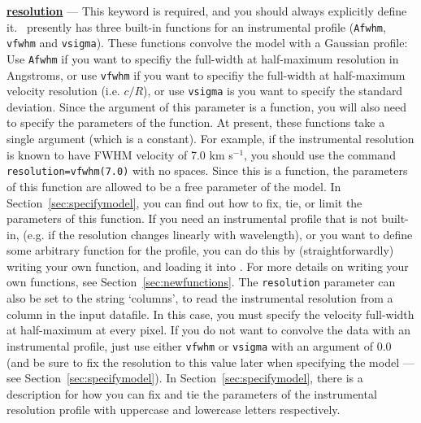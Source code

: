 \textbf{\underline{resolution}} --- This keyword is required, and you should
     always explicitly define it. \alis\ presently has three built-in functions
     for an instrumental profile (\texttt{Afwhm}, \texttt{vfwhm} and \texttt{vsigma}). These functions
     convolve the model with a Gaussian profile: Use \texttt{Afwhm} if you want to
     specifiy the full-width at half-maximum resolution in Angstroms, or use \texttt{vfwhm} if you want to
     specifiy the full-width at half-maximum velocity resolution (i.e. $c/R$), or use
     \texttt{vsigma} is you want to specify the standard deviation. Since the argument
     of this parameter is a function, you will also need to specify the parameters of
     the function. At present, these functions take a single
     argument (which is a constant). For example, if the instrumental resolution is
     known to have FWHM velocity of 7.0 km s$^{-1}$, you should use the command
     \texttt{resolution=vfwhm(7.0)} with no spaces. Since this is a function, the parameters
     of this function are allowed to be a free parameter of the model. In Section~\ref{sec:specifymodel},
     you can find out how to fix, tie, or limit the parameters of this function.
     If you need an instrumental profile that is not built-in, (e.g. if the resolution changes
     linearly with wavelength), or you want to define some arbitrary function for the profile,
     you can do this by (straightforwardly) writing your own function, and loading it into \alis.
     For more details on writing your own functions, see Section~\ref{sec:newfunctions}. The
     \texttt{resolution} parameter can also be set to the string `columns', to read the instrumental
     resolution from a column in the input datafile. In this case, you must specify the velocity
     full-width at half-maximum at every pixel. If you do not want to convolve the data with an instrumental
     profile, just use either \texttt{vfwhm} or \texttt{vsigma} with an argument of 0.0 (and be
     sure to fix the resolution to this value later when specifying the model --- see
     Section~\ref{sec:specifymodel}). In Section~\ref{sec:specifymodel}, there is a
     description for how you can fix and tie the parameters of the instrumental resolution
     profile with uppercase and lowercase letters respectively.

